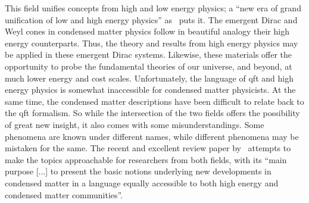 This field unifies concepts from high and low energy physics;
a ``new era of grand unification of low and high energy physics'' as~\textcite{chernodubThermalTransportGeometry2021} puts it.
The emergent Dirac and Weyl cones in condensed matter physics follow in beautiful analogy their high energy counterparts.
Thus, the theory and results from high energy physics may be applied in these emergent Dirac systems.
Likewise, these materials offer the opportunity to probe the fundamental theories of our universe, and beyond, at much lower energy and cost scales.
Unfortunately, the language of \gls{qft} and high energy physics is somewhat inaccessible for condensed matter physicists.
At the same time, the condensed matter descriptions have been difficult to relate back to the \gls{qft} formalism.
So while the intersection of the two fields offers the possibility of great new insight, it also comes with some misunderstandings.
Some phenomena are known under different names, while different phenomena may be mistaken for the same.
The recent and excellent review paper by~\textcite{chernodubThermalTransportGeometry2021} attempts to make the topics approachable for researchers from both fields, with its ``main purpose [...] to present the basic notions underlying new developments in condensed matter in a language equally accessible to both high energy and condensed matter communities''.

